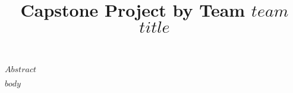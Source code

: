 \documentclass[mstat,12pt]{unswthesis}
\title{Capstone Project by Team $team$\\[0.5cm]$title$}
\author{\Authornameonly}
\begin{document}
\beforepreface

















$Abstract$



\afterpreface





%
%






$body$
\end{document}
